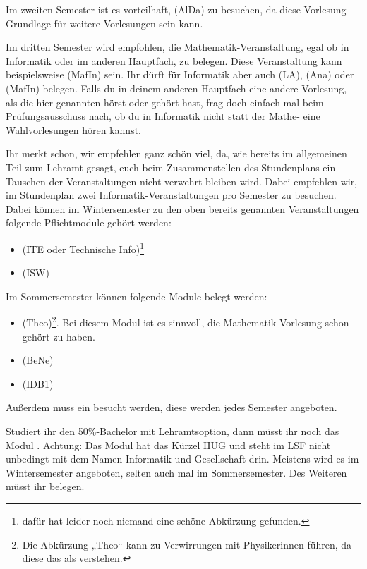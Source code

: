 Im zweiten Semester ist es vorteilhaft,  (\gls{AlDa}) zu besuchen, da diese Vorlesung Grundlage für weitere Vorlesungen sein kann.

Im dritten Semester wird empfohlen, die Mathematik-Veranstaltung, egal ob in Informatik oder im anderen Hauptfach, zu belegen. Diese Veranstaltung kann beispielsweise  (\gls{MafIn}) sein. Ihr dürft für Informatik aber auch  (\gls{LA}), (\gls{Ana}) oder  (\gls{MafIn}) belegen. Falls du in deinem anderen Hauptfach eine andere Vorlesung, als die hier genannten hörst oder gehört hast, frag doch einfach mal beim Prüfungsausschuss nach, ob du in Informatik nicht statt der Mathe- eine Wahlvorlesungen hören kannst.

Ihr merkt schon, wir empfehlen ganz schön viel, da, wie bereits im allgemeinen Teil zum Lehramt gesagt, euch beim Zusammenstellen des Stundenplans ein Tauschen der Veranstaltungen nicht verwehrt bleiben wird. Dabei empfehlen wir, im Stundenplan zwei Informatik-Veranstaltungen pro Semester zu besuchen. Dabei können im Wintersemester zu den oben bereits genannten Veranstaltungen folgende Pflichtmodule gehört werden:
\begin{itemize}
    \item {} (\gls{ITE} oder Technische Info)\footnote{dafür hat leider noch niemand eine schöne Abkürzung gefunden.}
    \item {} (\gls{ISW})
\end{itemize}
Im Sommersemester können folgende Module belegt werden:
\begin{itemize}
    \item {} (\gls{Theo})\footnote{Die Abkürzung „Theo“ kann zu Verwirrungen mit Physikerinnen führen, da diese das als  verstehen.}. Bei diesem Modul ist es sinnvoll, die Mathematik-Vorlesung schon gehört zu haben.
    \item {} (\gls{BeNe})
    \item {} (\gls{IDB1})
\end{itemize}
Außerdem muss ein  besucht werden, diese werden jedes Semester angeboten.

Studiert ihr den 50\%-Bachelor mit Lehramtsoption, dann müsst ihr noch das Modul . Achtung: Das Modul hat das Kürzel IIUG und steht im LSF nicht unbedingt mit dem Namen Informatik und Gesellschaft drin. Meistens wird es im Wintersemester angeboten, selten auch mal im Sommersemester. Des Weiteren müsst ihr  belegen.

